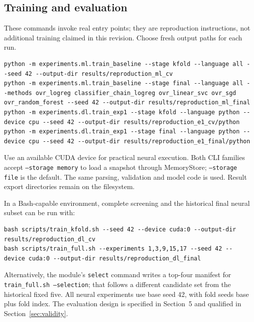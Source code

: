 \subsection{Training and evaluation}
These commands invoke real entry points; they are reproduction instructions, not additional training claimed in this revision. Choose fresh output paths for each run.
\begin{lstlisting}
python -m experiments.ml.train_baseline --stage kfold --language all --seed 42 --output-dir results/reproduction_ml_cv
python -m experiments.ml.train_baseline --stage final --language all --methods ovr_logreg classifier_chain_logreg ovr_linear_svc ovr_sgd ovr_random_forest --seed 42 --output-dir results/reproduction_ml_final
python -m experiments.dl.train_exp1 --stage kfold --language python --device cpu --seed 42 --output-dir results/reproduction_e1_cv/python
python -m experiments.dl.train_exp1 --stage final --language python --device cpu --seed 42 --output-dir results/reproduction_e1_final/python
\end{lstlisting}
Use an available CUDA device for practical neural execution. Both CLI families accept \texttt{--storage memory} to load a snapshot through MemoryStore; \texttt{--storage file} is the default. The same parsing, validation and model code is used. Result export directories remain on the filesystem.

In a Bash-capable environment, complete screening and the historical final neural subset can be run with:
\begin{lstlisting}
bash scripts/train_kfold.sh --seed 42 --device cuda:0 --output-dir results/reproduction_dl_cv
bash scripts/train_full.sh --experiments 1,3,9,15,17 --seed 42 --device cuda:0 --output-dir results/reproduction_dl_final
\end{lstlisting}
Alternatively, the  module's \texttt{select} command writes a top-four manifest for \texttt{train\_full.sh --selection}; that follows a different candidate set from the historical fixed five. All neural experiments use base seed 42, with fold seeds base plus fold index. The evaluation design is specified in Section~5 and qualified in Section~\ref{sec:validity}.

